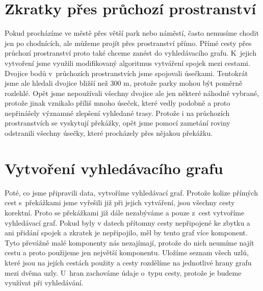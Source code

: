\section{Zkratky přes průchozí prostranství}
Pokud procházíme ve městě přes větší park nebo náměstí, často nemusíme chodit
jen po chodnících, ale můžeme projít přes prostranství přímo. Přímé cesty přes
průchozí prostranství proto také chceme zanést do vyhledávacího grafu. K~jejich
vytvoření jsme využili modifikovaný algoritmus vytváření spojek mezi cestami.
Dvojice bodů v~průchozích prostranstvích jsme spojovali úsečkami. Tentokrát jsme
ale hledali dvojice bližší než 300 m, protože parky mohou být poměrně rozlehlé.
Opět jsme nepoužívali všechny dvojice ale jen některé náhodně vybrané, protože
jinak vznikalo příliš mnoho úseček, které vedly podobně a proto nepřinášely
významné zlepšení vyhledané trasy. Protože i na průchozích prostranstvích se
vyskytují překážky, opět jsme pomocí zametání roviny odstranili všechny úsečky,
které procházely přes nějakou překážku.

\section{Vytvoření vyhledávacího grafu}
Poté, co jsme připravili data, vytvoříme vyhledávací graf. Protože kolize
přímých cest s~překážkami jsme vyřešili již při jejich vytváření, jsou všechny
cesty korektní. Proto se překážkami již dále nezabýváme a pouze z~cest vytvoříme
vyhledávací graf. Pokud byly v datech přítomny cesty nepřipojené ke zbytku a ani 
přidání spojek a zkratek je nepřipojilo, měl by tento graf více komponent. Tyto
převážně malé komponenty nás nezajímají, protože do nich neumíme najít cestu a
proto použijeme jen největší komponentu. Uložíme seznam všech uzlů, které jsou
na jejích cestách použity a cesty rozdělíme na jednotlivé hrany grafu mezi dvěma
uzly.  U~hran zachováme údaje o~typu cesty, protože je budeme využívat při
vyhledávání.
